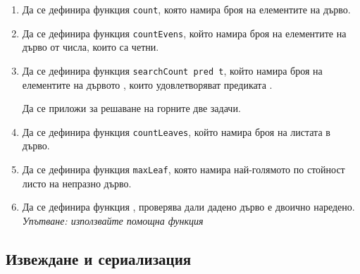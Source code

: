 \begin{enumerate}[]

	\item Да се дефинира функция \texttt{count}, която намира броя на елементите на дърво.

	\item Да се дефинира функция \texttt{countEvens}, който намира броя на елементите на дърво от числа, които са четни.

	\item Да се дефинира функция \verb#searchCount pred t#, който намира броя на елементите на дървото , които удовлетворяват предиката .

	Да се приложи  за решаване на горните две задачи.

	\item Да се дефинира функция \texttt{countLeaves}, който намира броя на листата в дърво.

	\item Да се дефинира функция \texttt{maxLeaf}, която намира най-голямото по стойност листо на непразно дърво. 

  \item Да се дефинира функция , проверява дали дадено дърво е двоично наредено. \emph{Упътване: използвайте помощна функция}


\end{enumerate}

\subsection {Извеждане и сериализация}
  

